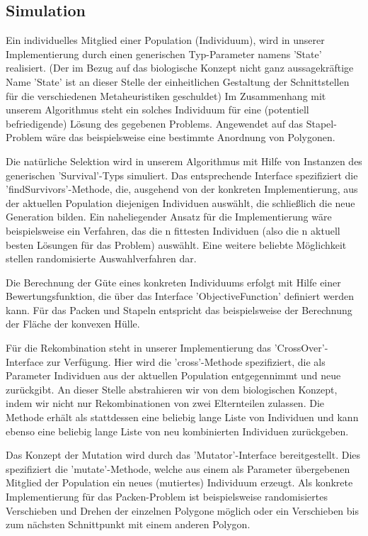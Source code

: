 \documentclass[runningheads,a4paper]{llncs}
\begin{document}
\subsection{Simulation}

Ein individuelles Mitglied einer Population (Individuum), wird in unserer Implementierung durch einen generischen Typ-Parameter namens 'State' realisiert. (Der im Bezug auf das biologische Konzept nicht ganz aussagekräftige Name 'State' ist an dieser Stelle der einheitlichen Gestaltung der Schnittstellen für die verschiedenen Metaheuristiken geschuldet) Im Zusammenhang mit unserem Algorithmus steht ein solches Individuum für eine (potentiell befriedigende) Lösung des gegebenen Problems. Angewendet auf das Stapel-Problem wäre das beispielsweise eine bestimmte Anordnung von Polygonen.

\begin{sloppypar}
Die natürliche Selektion wird in unserem Algorithmus mit Hilfe von Instanzen des generischen 'Survival'-Typs simuliert. Das entsprechende Interface spezifiziert die 'findSurvivors'-Methode, die, ausgehend von der konkreten Implementierung, aus der aktuellen Population diejenigen Individuen auswählt, die schließlich die neue Generation bilden. Ein naheliegender Ansatz für die Implementierung wäre beispielsweise ein Verfahren, das die n fittesten Individuen (also die n aktuell besten Lösungen für das Problem) auswählt. Eine weitere beliebte Möglichkeit stellen randomisierte Auswahlverfahren dar.
\end{sloppypar}

Die Berechnung der Güte eines konkreten Individuums erfolgt mit Hilfe einer Bewertungsfunktion, die über das Interface 'ObjectiveFunction' definiert werden kann. Für das Packen und Stapeln entspricht das beispielsweise der Berechnung der Fläche der konvexen Hülle.

Für die Rekombination steht in unserer Implementierung das 'CrossOver'-Interface zur Verfügung. Hier wird die 'cross'-Methode spezifiziert, die als Parameter Individuen aus der aktuellen Population entgegennimmt und neue zurückgibt. An dieser Stelle abstrahieren wir von dem biologischen Konzept, indem wir nicht nur Rekombinationen von zwei Elternteilen zulassen. Die Methode erhält als stattdessen eine beliebig lange Liste von Individuen und kann ebenso eine beliebig lange Liste von neu kombinierten Individuen zurückgeben.     

Das Konzept der Mutation wird durch das 'Mutator'-Interface bereitgestellt. Dies spezifiziert die 'mutate'-Methode, welche aus einem als Parameter übergebenen Mitglied der Population ein neues (mutiertes) Individuum erzeugt. Als konkrete Implementierung für das Packen-Problem ist beispielsweise randomisiertes Verschieben und Drehen der einzelnen Polygone möglich oder ein Verschieben bis zum nächsten Schnittpunkt mit einem anderen Polygon.
\end{document}
